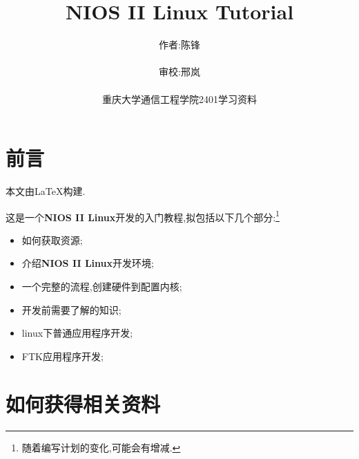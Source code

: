 \documentclass[12pt,a4paper,titlepage]{article}
\title{NIOS II Linux Tutorial}
\author{作者:陈锋\\\\审校:邢岚\\\\重庆大学通信工程学院2401学习资料}
\date{}
\begin{document}
\thispagestyle{empty}
\maketitle{}
\section{前言}
\setcounter{footnote}{0}
本文由\LaTeX{}构建.

这是一个\textbf{NIOS II Linux}开发的入门教程,拟包括以下几个部分:\footnote{随着编写计划的变化,可能会有增减.}
\begin{itemize}
\item 如何获取资源;
\item 介绍\textbf{NIOS II Linux}开发环境;
\item 一个完整的流程,创建硬件到配置内核;
\item 开发前需要了解的知识;
\item linux下普通应用程序开发;
\item FTK应用程序开发;
\end{itemize}

\newpage{}
\section{如何获得相关资料}
\setcounter{footnote}{0}
\end{document}
